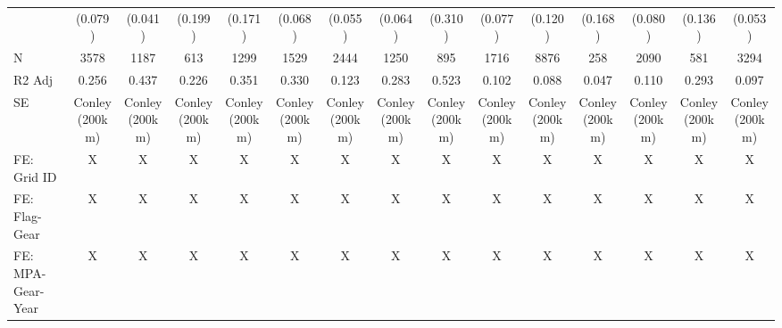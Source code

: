 \begin{table}
\begin{tabular}[t]{lcccccccccccccc}
\hspace{1em} & (0.079) & (0.041) & (0.199) & (0.171) & (0.068) & (0.055) & (0.064) & (0.310) & (0.077) & (0.120) & (0.168) & (0.080) & (0.136) & (0.053)\\
\hspace{1em}N & 3578 & 1187 & 613 & 1299 & 1529 & 2444 & 1250 & 895 & 1716 & 8876 & 258 & 2090 & 581 & 3294\\
\hspace{1em}R2 Adj & 0.256 & 0.437 & 0.226 & 0.351 & 0.330 & 0.123 & 0.283 & 0.523 & 0.102 & 0.088 & 0.047 & 0.110 & 0.293 & 0.097\\
\hspace{1em}SE & Conley (200km) & Conley (200km) & Conley (200km) & Conley (200km) & Conley (200km) & Conley (200km) & Conley (200km) & Conley (200km) & Conley (200km) & Conley (200km) & Conley (200km) & Conley (200km) & Conley (200km) & Conley (200km)\\
\hspace{1em}FE: Grid ID & X & X & X & X & X & X & X & X & X & X & X & X & X & X\\
\hspace{1em}FE: Flag-Gear & X & X & X & X & X & X & X & X & X & X & X & X & X & X\\
\hspace{1em}FE: MPA-Gear-Year & X & X & X & X & X & X & X & X & X & X & X & X & X & X\\
\bottomrule
\end{tabular}
\end{table}